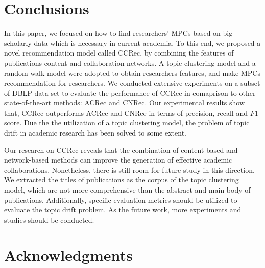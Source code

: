 \documentclass[10pt]{article}
\begin{document}
\section*{Conclusions}
In this paper, we focused on how to find researchers' MPCs based on big scholarly data which is necessary in current academia. To this end, we proposed a novel recommendation model called CCRec, by combining the features of publications content and collaboration networks. A topic clustering model and a random walk model were adopted to obtain researchers features, and make MPCs recommendation for researchers. We conducted extensive experiments on a subset of DBLP data set to evaluate the performance of CCRec in comaprison to other state-of-the-art methods: ACRec and CNRec. Our experimental results show that, CCRec outperforms ACRec and CNRec in terms of precision, recall and $F1$ score. Due the the utilization of a topic clustering model, the problem of topic drift in academic research has been solved to some extent.

Our research on CCRec reveals that the combination of content-based and network-based methods can improve the generation of effective academic collaborations. Nonetheless, there is still room for future study in this direction. We extracted the titles of publications as the corpus of the topic clustering model, which are not more comprehensive than the abstract and main body of publications. Additionally, specific evaluation metrics should be utilized to evaluate the topic drift problem. As the future work, more experiments and studies should be conducted.


\section*{Acknowledgments}


\end{document}
